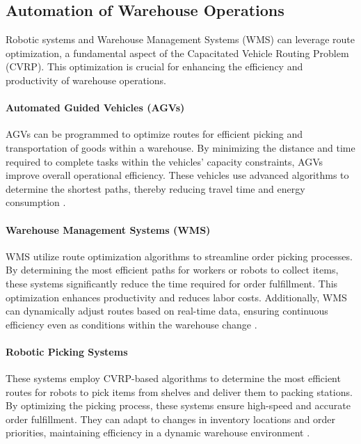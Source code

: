 \documentclass[
]{article}
\begin{document}
    \subsection{Automation of Warehouse Operations}\label{subsec:automation-of-warehouse-operations}

    Robotic systems and Warehouse Management Systems (WMS) can leverage route optimization, a fundamental aspect of the Capacitated Vehicle Routing Problem (CVRP). This optimization is crucial for enhancing the efficiency and productivity of warehouse operations.

    \paragraph{Automated Guided Vehicles (AGVs)}
    AGVs can be programmed to optimize routes for efficient picking and transportation of goods within a warehouse. By minimizing the distance and time required to complete tasks within the vehicles' capacity constraints, AGVs improve overall operational efficiency. These vehicles use advanced algorithms to determine the shortest paths, thereby reducing travel time and energy consumption \cite{agv_optimization}.

    \paragraph{Warehouse Management Systems (WMS)}
    WMS utilize route optimization algorithms to streamline order picking processes. By determining the most efficient paths for workers or robots to collect items, these systems significantly reduce the time required for order fulfillment. This optimization enhances productivity and reduces labor costs. Additionally, WMS can dynamically adjust routes based on real-time data, ensuring continuous efficiency even as conditions within the warehouse change \cite{wms_optimization}.

    \paragraph{Robotic Picking Systems}
    These systems employ CVRP-based algorithms to determine the most efficient routes for robots to pick items from shelves and deliver them to packing stations. By optimizing the picking process, these systems ensure high-speed and accurate order fulfillment. They can adapt to changes in inventory locations and order priorities, maintaining efficiency in a dynamic warehouse environment \cite{robotic_picking}.
\end{document}
